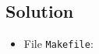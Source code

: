 
\subsection*{Solution}

\lstset{language=[gnu]make,tabsize=4}
\begin{itemize}
\item[] File \texttt{Makefile}:

\end{itemize}
